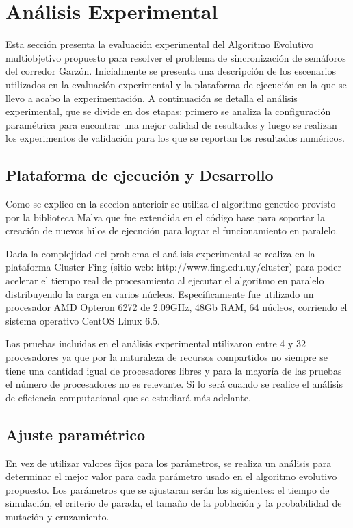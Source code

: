 \chapter{Análisis Experimental}
Esta sección presenta la evaluación experimental del Algoritmo Evolutivo multiobjetivo propuesto para resolver el problema de sincronización de semáforos del corredor Garzón. Inicialmente se presenta una descripción de los escenarios utilizados en la evaluación experimental y la plataforma de ejecución en la que se llevo a acabo la experimentación. A continuación se detalla el análisis experimental, que se divide en dos etapas: primero se analiza la configuración paramétrica para encontrar una mejor calidad de resultados y luego se realizan los experimentos de validación para los que se reportan los resultados numéricos.



\section{Plataforma de ejecución y Desarrollo}
Como se explico en la seccion anterioir se utiliza el algoritmo genetico provisto por la biblioteca Malva que fue extendida en el código base para soportar la creación de nuevos hilos de ejecución para lograr el funcionamiento en paralelo.

Dada la complejidad del problema el análisis experimental  se realiza en la plataforma Cluster Fing (sitio web: http://www.fing.edu.uy/cluster) para poder acelerar el tiempo real de procesamiento al ejecutar el algoritmo en paralelo distribuyendo la carga en varios núcleos. Específicamente fue utilizado un procesador AMD Opteron 6272 de 2.09GHz, 48Gb RAM, 64 núcleos, corriendo el sistema operativo CentOS Linux 6.5.

Las pruebas incluidas en el análisis experimental utilizaron entre 4 y 32 procesadores ya que por la naturaleza de recursos compartidos no siempre se tiene una cantidad igual de procesadores libres y para la mayoría de las pruebas el número de procesadores no es relevante. Si lo será cuando se realice el análisis de eficiencia computacional que se estudiará más adelante.


\section{Ajuste paramétrico}
En vez de utilizar valores fijos para los parámetros, se realiza un análisis para determinar el mejor valor para cada parámetro usado en el algoritmo evolutivo propuesto. Los parámetros que se ajustaran serán los siguientes: el tiempo de simulación, el criterio de parada, el tamaño de la población y la probabilidad de mutación y cruzamiento.

